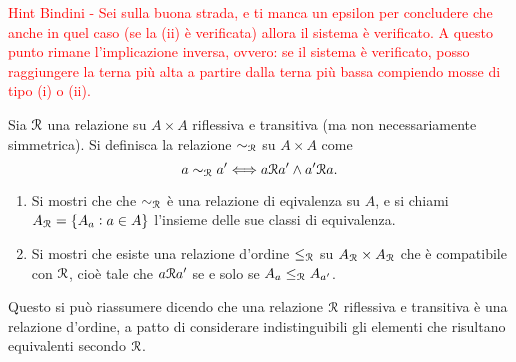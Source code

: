 \textcolor{red}{Hint Bindini - Sei sulla buona strada, e ti manca un epsilon per concludere che anche in quel caso (se la (ii) è verificata) allora il sistema è verificato. A questo punto rimane l'implicazione inversa, ovvero: se il sistema è verificato, posso raggiungere la terna più alta a partire dalla terna più bassa compiendo mosse di tipo (i) o (ii).}

\begin{es}
  Sia $ \mathcal{R} $ una relazione su $ A \times A $ riflessiva e transitiva (ma non necessariamente simmetrica). Si definisca la relazione $ \sim_{\mathcal{R}}  $ su $ A \times A $ come \[a \sim_{\mathcal{R}} a' \Longleftrightarrow a \mathcal{R} a' \wedge a' \mathcal{R} a.\]
  \begin{enumerate}
  \item Si mostri che che $ \sim_{\mathcal{R}} $ è una relazione di eqivalenza su $ A $, e si chiami $ A_{\mathcal{R}} = \{A_a : a \in A\} $ l'insieme delle sue classi di equivalenza.
  \item Si mostri che esiste una relazione d'ordine $ \leq_{\mathcal{R}} $ su $ A_{\mathcal{R}} \times A_{\mathcal{R}} $ che è compatibile con $ \mathcal{R} $, cioè tale che $ a \mathcal{R} a' $ se e solo se $ A_a \leq_{\mathcal{R}} A_{a'} $.
  \end{enumerate}
  Questo si può riassumere dicendo che una relazione $ \mathcal{R} $ riflessiva e transitiva è una relazione d'ordine, a patto di considerare indistinguibili gli elementi che risultano equivalenti secondo $ \mathcal{R} $.
\end{es}
